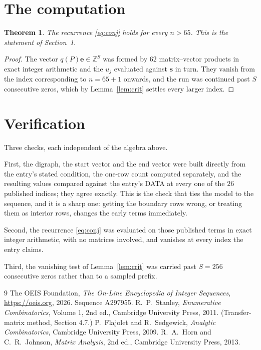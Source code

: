 \documentclass[11pt,a4paper]{article}
\theoremstyle{plain}
\newtheorem{theorem}{Theorem}
\theoremstyle{definition}
\begin{document}
\section{The computation}

\begin{theorem}
The recurrence \eqref{eq:conj} holds for every $n>65$. This is the statement of
Section~1.
\end{theorem}

\begin{proof}
The vector $q(P)\mathbf{e}\in\mathbb{Z}^{S}$ was formed by $62$ matrix--vector
products in exact integer arithmetic and the $u_j$ evaluated against $\mathbf{s}$ in turn.
They vanish from the index corresponding to $n=65+1$ onwards, and the run was continued
past $S$ consecutive zeros, which by Lemma~\ref{lem:crit} settles every larger index.
\end{proof}

\section{Verification}

Three checks, each independent of the algebra above.

First, the digraph, the start vector and the end vector were built directly from the
entry's stated condition, the one-row count computed separately, and the resulting values
compared against the entry's DATA at every one of the $26$ published indices; they
agree exactly. This is the check that ties the model to the sequence, and it is a sharp one:
getting the boundary rows wrong, or treating them as interior rows, changes the early terms
immediately.

Second, the recurrence \eqref{eq:conj} was evaluated on those published terms in exact
integer arithmetic, with no matrices involved, and vanishes at every index the entry claims.

Third, the vanishing test of Lemma~\ref{lem:crit} was carried past $S=256$ consecutive
zeros rather than to a sampled prefix.

\begin{thebibliography}{9}
 The OEIS Foundation, \emph{The On-Line Encyclopedia of Integer
Sequences}, \url{https://oeis.org}, 2026. Sequence A297955.
 R.~P.~Stanley, \emph{Enumerative Combinatorics}, Volume 1, 2nd ed.,
Cambridge University Press, 2011. (Transfer-matrix method, Section 4.7.)
 P.~Flajolet and R.~Sedgewick, \emph{Analytic Combinatorics}, Cambridge
University Press, 2009.
 R.~A.~Horn and C.~R.~Johnson, \emph{Matrix Analysis}, 2nd ed., Cambridge
University Press, 2013.
\end{thebibliography}
\end{document}
